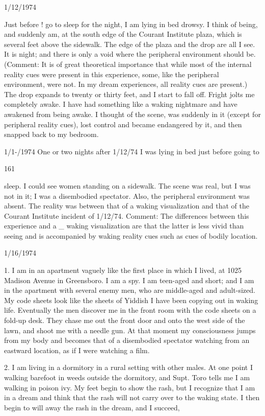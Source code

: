 \documentclass[10pt,twoside]{memoir}
\begin{document}
\begin{enumerate}
{1/12/1974 

Just before ! go to sleep for the night, I am lying in bed drowsy. I think 
of being, and suddenly am, at the south edge of the Courant Institute plaza, 
which is several feet above the sidewalk. The edge of the plaza and the drop 
are all I see. It is night; and there is only a void where the peripheral 
environment should be. (Comment: It is of great theoretical importance that 
while most of the internal reality cues were present in this experience, some, 
like the peripheral environment, were not. In my dream experiences, all 
reality cues are present.) The drop expands to twenty or thirty feet, and I 
start to fall off. Fright jolts me completely awake. I have had something like 
a waking nightmare and have awakened from being awake. I thought of the 
scene, was suddenly in it (except for peripheral reality cues), lost control and 
became endangered by it, and then snapped back to my bedroom. 


1/1-/1974 
One or two nights after 1/12/74 I was lying in bed just before going to 


161 


sleep. I could see women standing on a sidewalk. The scene was real, but I 
was not in it; I was a disembodied spectator. Also, the peripheral 
environment was absent. The reality was between that of a waking 
visualization and that of the Courant Institute incident of 1/12/74. 
Comment: The differences between this experience and a _ waking 
visualization are that the latter is less vivid than seeing and is accompanied 
by waking reality cues such as cues of bodily location. 


1/16/1974 

1. I am in an apartment vaguely like the first place in which I lived, at 
1025 Madison Avenue in Greensboro. I am a spy. I am teen-aged and short; 
and I am in the apartment with several enemy men, who are middle-aged and 
adult-sized. My code sheets look like the sheets of Yiddish I have been 
copying out in waking life. Eventually the men discover me in the front 
room with the code sheets on a fold-up desk. They chase me out the front 
door and onto the west side of the lawn, and shoot me with a needle gun. At 
that moment my consciousness jumps from my body and becomes that of a 
disembodied spectator watching from an eastward location, as if I were 
watching a film. 

2. I am living in a dormitory in a rural setting with other males. At one 
point I walking barefoot in weeds outside the dormitory, and Supt. Toro 
tells me I am walking in poison ivy. My feet begin to show the rash, but I 
recognize that I am in a dream and think that the rash will not carry over to 
the waking state. I then begin to will away the rash in the dream, and I 
succeed, 


}
\end{enumerate}
\end{document}
